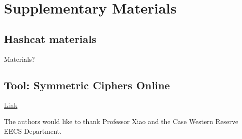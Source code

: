 \documentclass[acmlarge]{acmart}
\begin{document}
\section{Supplementary Materials}

\subsection{Hashcat materials}

Materials?

\subsection{Tool: Symmetric Ciphers Online }

\href{http://symmetric-ciphers.online-domain-tools.com/}{Link}

\begin{acks}

The authors would like to thank Professor Xiao and the Case Western Reserve EECS Department.

\end{acks}



\end{document}
